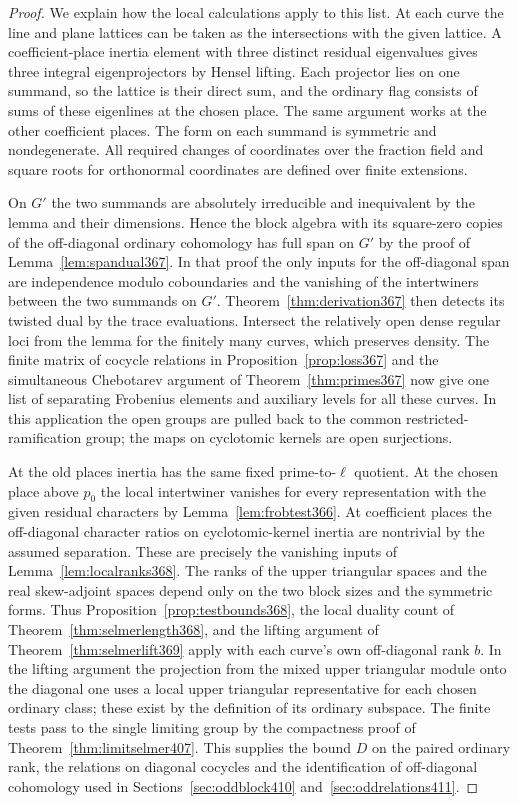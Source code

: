 \documentclass[a4paper,11pt]{article}
\theoremstyle{definition}
\theoremstyle{remark}
\numberwithin{equation}{section}
\begin{document}
\begin{proof}
We explain how the local calculations apply to this list.
At each curve the line and plane lattices can be taken as
the intersections with the given lattice. A coefficient-place
inertia element with three distinct residual eigenvalues gives
three integral eigenprojectors by Hensel lifting. Each
projector lies on one summand, so the lattice is their direct
sum, and the ordinary flag consists of sums of these
eigenlines at the chosen place. The same argument works
at the other coefficient places. The form on each summand is
symmetric and nondegenerate. All required changes of coordinates
over the fraction field and square roots for orthonormal
coordinates are defined over finite extensions.

On \(G'\) the two summands are absolutely irreducible and
inequivalent by the lemma and their dimensions. Hence the
block algebra with its square-zero copies of the off-diagonal
ordinary cohomology has full span on \(G'\) by the proof of
Lemma~\ref{lem:spandual367}. In that proof the only inputs for
the off-diagonal span are independence modulo coboundaries
and the vanishing of the intertwiners between the two summands
on \(G'\). Theorem~\ref{thm:derivation367} then detects its
twisted dual by the trace evaluations. Intersect the relatively
open dense regular loci from the lemma for the finitely many
curves, which preserves density. The finite matrix of cocycle
relations in Proposition~\ref{prop:loss367} and the simultaneous
Chebotarev argument of Theorem~\ref{thm:primes367} now give one
list of separating Frobenius elements and auxiliary levels for
all these curves. In this application the open groups are
pulled back to the common restricted-ramification group; the
maps on cyclotomic kernels are open surjections.

At the old places inertia has the same fixed prime-to-\(\ell\)
quotient. At the chosen place above \(p_0\) the local
intertwiner vanishes for every representation with the given
residual characters by Lemma~\ref{lem:frobtest366}. At
coefficient places the off-diagonal character ratios on
cyclotomic-kernel inertia are nontrivial by the assumed
separation. These are precisely the vanishing inputs of
Lemma~\ref{lem:localranks368}. The ranks of the upper
triangular spaces and the real skew-adjoint spaces depend only
on the two block sizes and the symmetric forms. Thus
Proposition~\ref{prop:testbounds368}, the local duality count
of Theorem~\ref{thm:selmerlength368}, and the lifting argument
of Theorem~\ref{thm:selmerlift369} apply with each curve's own
off-diagonal rank \(b\). In the lifting argument the projection
from the mixed upper triangular module onto the diagonal one
uses a local upper triangular representative for each chosen
ordinary class; these exist by the definition of its ordinary
subspace. The finite tests pass to the single limiting group
by the compactness proof of Theorem~\ref{thm:limitselmer407}.
This supplies the bound \(D\) on the paired ordinary rank,
the relations on diagonal cocycles and the identification of
off-diagonal cohomology used in Sections~\ref{sec:oddblock410}
and~\ref{sec:oddrelations411}.


\end{proof}
\end{document}

